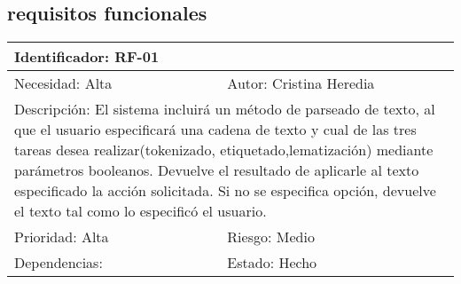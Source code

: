 \subsection*{requisitos funcionales}
\begin{table}[H]
\label{my-label}
\begin{tabular}{|l|l|l|l|l|l|l|}
\hline
\multicolumn{7}{|l|}{\textcolor{SchoolColor}{Identificador:} RF-01}                                 \\ \hline
\multicolumn{4}{|l|}{\textcolor{SchoolColor}{Necesidad:} Alta} & \multicolumn{3}{l|}{\textcolor{SchoolColor}{Autor:} Cristina Heredia}         \\ \hline
\multicolumn{7}{|L|}{\textcolor{SchoolColor}{Descripción:} El sistema incluirá un método de parseado de texto, al que el usuario  especificará una cadena de texto y cual de las tres tareas desea realizar(tokenizado, etiquetado,lematización) mediante parámetros booleanos. Devuelve el resultado de aplicarle al texto especificado la acción solicitada. Si no se especifica opción, devuelve el texto tal como lo especificó el usuario.  }                                 \\ \hline
\multicolumn{4}{|l|}{\textcolor{SchoolColor}{Prioridad: }Alta} & \multicolumn{3}{l|}{\textcolor{SchoolColor}{Riesgo:} Medio}         \\ \hline
\multicolumn{5}{|l|}{\textcolor{SchoolColor}{Dependencias: }}         & \multicolumn{2}{l|}{\textcolor{SchoolColor}{Estado:} Hecho} \\ \hline
\end{tabular}
\end{table}












